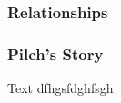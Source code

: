 \subsubsection{Relationships}



\subsubsection{Pilch's Story}



\begin{DndSidebar}{Text}
 dfhgsfdghfsgh
\end{DndSidebar}

\smallskip

\bigskip


\clearpage